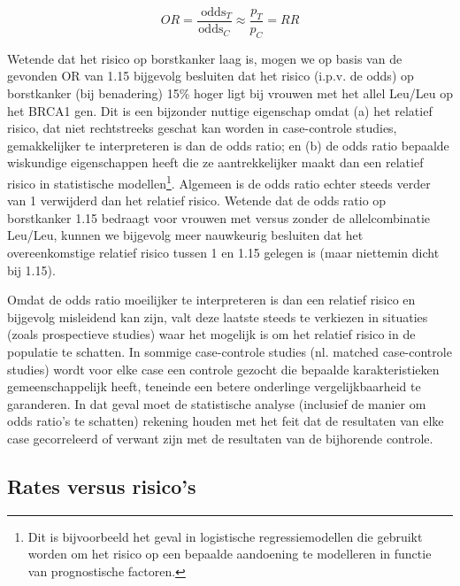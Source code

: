 \documentclass[
  12pt,dutch,coursenotes]{book}
\theoremstyle{definition}
\theoremstyle{definition}
\theoremstyle{definition}
\theoremstyle{definition}
\theoremstyle{remark}
\begin{document}
\begin{equation*}
OR=\frac{\mbox{ odds}_T}{\mbox{
odds}_C}\approx \frac{p_T}{p_C}=RR
\end{equation*}

Wetende dat het risico op borstkanker laag is, mogen we
op basis van de gevonden OR van 1.15 bijgevolg
besluiten dat het risico (i.p.v. de odds) op borstkanker (bij benadering) 15\% hoger ligt bij vrouwen met het allel Leu/Leu op het BRCA1 gen. Dit is een bijzonder
nuttige eigenschap omdat (a) het relatief risico, dat niet rechtstreeks
geschat kan worden in case-controle studies, gemakkelijker te interpreteren
is dan de odds ratio; en (b) de odds ratio bepaalde wiskundige eigenschappen
heeft die ze aantrekkelijker maakt dan een relatief risico in statistische
modellen\footnote{Dit is bijvoorbeeld het geval in logistische regressiemodellen die gebruikt worden om het
  risico op een bepaalde aandoening te modelleren in functie van prognostische
  factoren.}. Algemeen is de odds ratio echter steeds verder van 1 verwijderd
dan het relatief risico. Wetende dat de odds ratio op borstkanker 1.15
bedraagt voor vrouwen met versus zonder de allelcombinatie Leu/Leu, kunnen we bijgevolg meer
nauwkeurig besluiten dat het overeenkomstige relatief risico tussen 1 en 1.15
gelegen is (maar niettemin dicht bij 1.15).

Omdat de odds ratio moeilijker te interpreteren is dan een relatief risico
en bijgevolg misleidend kan zijn, valt deze laatste steeds te verkiezen in
situaties (zoals prospectieve studies) waar het mogelijk is om het relatief
risico in de populatie te schatten. In sommige case-controle studies (nl.
matched case-controle studies) wordt voor elke case een controle gezocht die
bepaalde karakteristieken gemeenschappelijk heeft, teneinde een betere
onderlinge vergelijkbaarheid te garanderen. In dat geval moet de
statistische analyse (inclusief de manier om odds ratio's te schatten)
rekening houden met het feit dat de resultaten van elke case gecorreleerd of
verwant zijn met de resultaten van de bijhorende controle.

\hypertarget{rates-versus-risicos}{%
\subsection{Rates versus risico's}\label{rates-versus-risicos}}
\end{document}
